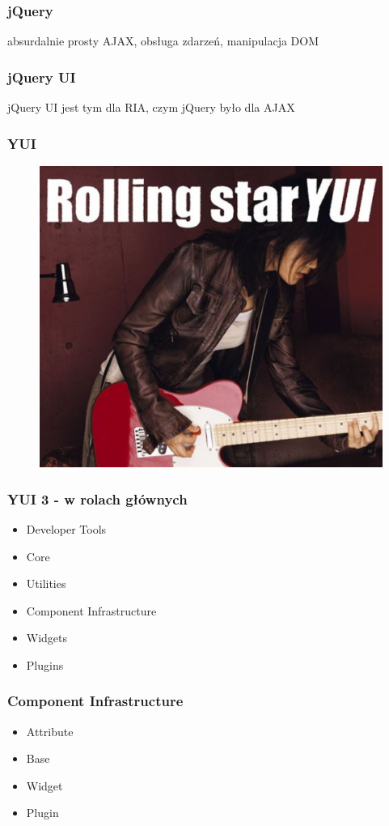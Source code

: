 \documentclass[16pt]{beamer}
\begin{document}
\begin{frame}
  \frametitle{jQuery}
  \begin{center}
    absurdalnie prosty AJAX, obsługa zdarzeń, manipulacja DOM
  \end{center}
\end{frame}

\begin{frame}
  \frametitle{jQuery UI}
  \begin{center}
    jQuery UI jest tym dla RIA, czym jQuery było dla AJAX
  \end{center}
\end{frame}

\begin{frame}
  \frametitle{YUI}
  \begin{figure}
    \includegraphics[width=0.8\linewidth]{yui.jpg}
  \end{figure}
\end{frame}

\begin{frame}
  \frametitle{YUI 3 - w rolach głównych}
  \begin{itemize}
  \item Developer Tools
  \item Core
  \item Utilities
  \item Component Infrastructure
  \item Widgets
  \item Plugins
  \end{itemize}
\end{frame}

\begin{frame}
  \frametitle{Component Infrastructure}
  \begin{itemize}
  \item Attribute
  \item Base
  \item Widget
  \item Plugin
  \end{itemize}
\end{frame}
\end{document}
